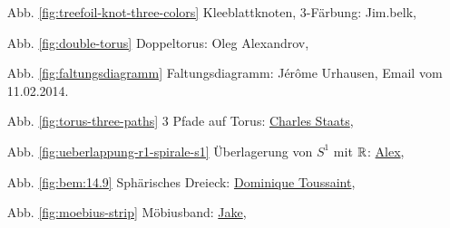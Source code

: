 \begin{itemize}
    \item[Abb. \ref{fig:treefoil-knot-three-colors}] Kleeblattknoten, 3-Färbung: Jim.belk, \href{https://commons.wikimedia.org/wiki/File:Tricoloring.png}{}
    \item[Abb. \ref{fig:double-torus}] Doppeltorus: Oleg Alexandrov, \href{https://commons.wikimedia.org/wiki/File:Double_torus_illustration.png}{}
    \item[Abb. \ref{fig:faltungsdiagramm}] Faltungsdiagramm: Jérôme Urhausen, Email vom 11.02.2014.
    \item[Abb. \ref{fig:torus-three-paths}] 3 Pfade auf Torus: \href{http://tex.stackexchange.com/users/484/charles-staats}{Charles Staats}, \href{http://tex.stackexchange.com/a/149991/5645}{}
    \item[Abb. \ref{fig:ueberlappung-r1-spirale-s1}] Überlagerung von $S^1$ mit $\mathbb{R}$: \href{http://tex.stackexchange.com/users/22467/alex}{Alex}, \href{http://tex.stackexchange.com/a/149706/5645}{}
    \item[Abb. \ref{fig:bem:14.9}] Sphärisches Dreieck: \href{https://commons.wikimedia.org/wiki/User:DemonDeLuxe}{Dominique Toussaint},\\
        \href{https://commons.wikimedia.org/wiki/File:Spherical_triangle_3d_opti.png}{}
    \item[Abb. \ref{fig:moebius-strip}] Möbiusband: \href{http://tex.stackexchange.com/users/2552/jake}{Jake},
        \href{http://tex.stackexchange.com/a/118573/5645}{}
\end{itemize}
